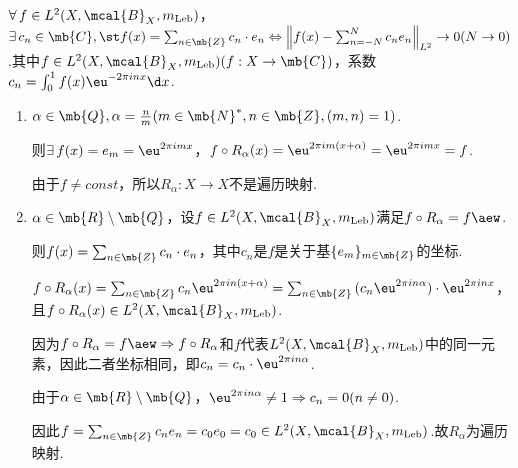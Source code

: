\begin{instance}
    $\forall\,f\in L^2(X,\mcal{B}_X,m_\mathrm{Leb})$，$\exists\, c_n\in\mb{C},\st f(x)=\sum_{n\in\mb{Z}}{c_n\cdot e_n}\Leftrightarrow \left\|f(x)-\sum_{n=-N}^N{c_n e_n}\right\|_{L^2}\to 0(N\to 0)$.其中$f\in L^2(X,\mcal{B}_X,m_\mathrm{Leb})(f:X\to\mb{C})$，系数$c_n=\int_0^1{f(x)\eu^{-2\pi inx}}\d x$.\par
    \begin{enumerate}[(1)]
        \item $\alpha\in\mb{Q},\alpha=\frac{n}{m}(m\in\mb{N}^*,n\in\mb{Z},(m,n)=1)$.\par
        则$\exists\, f(x)=e_m=\eu^{2\pi imx}$，$f\circ R_\alpha(x)=\eu^{2\pi im(x+\alpha)}=\eu^{2\pi imx}=f$.\par
        由于$f\neq const$，所以$R_\alpha:X\to X$不是遍历映射.
        \item $\alpha\in\mb{R}\setminus\mb{Q}$，设$f\in L^2(X,\mcal{B}_X,m_\mathrm{Leb})$满足$f\circ R_\alpha=f\aew$.\par
        则$f(x)=\sum_{n\in\mb{Z}}{c_n\cdot e_n}$，其中$c_n$是$f$是关于基$\{e_m\}_{m\in\mb{Z}}$的坐标.\par
        $f\circ R_\alpha(x)=\sum_{n\in\mb{Z}}{c_n \eu^{2\pi in(x+\alpha)}}=\sum_{n\in\mb{Z}}{(c_n \eu^{2\pi in\alpha})\cdot \eu^{2\pi inx}}$，且$f\circ R_\alpha(x)\in L^2(X,\mcal{B}_X,m_\mathrm{Leb})$.\par
        因为$f\circ R_\alpha=f\aew \Rightarrow f\circ R_\alpha$和$f$代表$L^2(X,\mcal{B}_X,m_\mathrm{Leb})$中的同一元素，因此二者坐标相同，即$c_n=c_n\cdot \eu^{2\pi in\alpha}$.\par
        由于$\alpha\in\mb{R}\setminus\mb{Q}$，$\eu^{2\pi in\alpha}\neq 1 \Rightarrow c_n=0(n\neq 0)$.\par
        因此$f=\sum_{n\in\mb{Z}}{c_ne_n}=c_0e_0=c_0\in L^2(X,\mcal{B}_X,m_\mathrm{Leb})$.故$R_\alpha$为遍历映射.
    \end{enumerate}
\end{instance}

